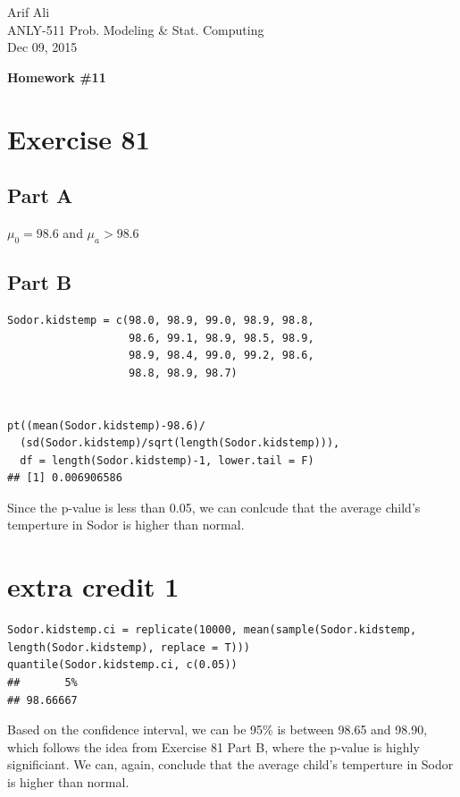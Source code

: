 \documentclass{article}\usepackage[]{graphicx}\usepackage[]{color}
\makeatletter
\newenvironment{kframe}{%
 \def\at@end@of@kframe{}%
 \ifinner\ifhmode%
  \def\at@end@of@kframe{\end{minipage}}%
  \begin{minipage}{\columnwidth}%
 \fi\fi%
 \def\FrameCommand##1{\hskip\@totalleftmargin \hskip-\fboxsep
 \colorbox{shadecolor}{##1}\hskip-\fboxsep
     \hskip-\linewidth \hskip-\@totalleftmargin \hskip\columnwidth}%
 \MakeFramed {\advance\hsize-\width
   \@totalleftmargin\z@ \linewidth\hsize
   \@setminipage}}%
 {\par\unskip\endMakeFramed%
 \at@end@of@kframe}
\newenvironment{knitrout}{}{} %
\makeatother
\begin{document}
\begin{flushright}
  Arif Ali\\
  ANLY-511 Prob. Modeling \& Stat. Computing\\
	Dec 09, 2015\\
\end{flushright}

\begin{center}
  \LARGE\textbf{Homework \#11}
\end{center}
\section*{Exercise 81}
\subsection*{Part A}
$\mu_{0}=98.6$ and $\mu_{a}>98.6$
\subsection*{Part B}
\begin{knitrout}
\color{fgcolor}\begin{kframe}
\begin{verbatim}
Sodor.kidstemp = c(98.0, 98.9, 99.0, 98.9, 98.8,
                   98.6, 99.1, 98.9, 98.5, 98.9, 
                   98.9, 98.4, 99.0, 99.2, 98.6, 
                   98.8, 98.9, 98.7)


pt((mean(Sodor.kidstemp)-98.6)/
  (sd(Sodor.kidstemp)/sqrt(length(Sodor.kidstemp))), 
  df = length(Sodor.kidstemp)-1, lower.tail = F)
## [1] 0.006906586
\end{verbatim}
\end{kframe}
\end{knitrout}
Since the p-value is less than 0.05, we can conlcude that the average child's temperture in Sodor is higher than normal.
\section*{extra credit 1}
\begin{knitrout}
\color{fgcolor}\begin{kframe}
\begin{verbatim}
Sodor.kidstemp.ci = replicate(10000, mean(sample(Sodor.kidstemp, length(Sodor.kidstemp), replace = T)))
quantile(Sodor.kidstemp.ci, c(0.05))
##       5% 
## 98.66667
\end{verbatim}
\end{kframe}
\end{knitrout}
Based on the confidence interval, we can be 95\% is between 98.65 and 98.90, which follows the idea from Exercise 81 Part B, where the p-value is highly significiant. We can, again, conclude that the average child's temperture in Sodor is higher than normal.
\end{document}
